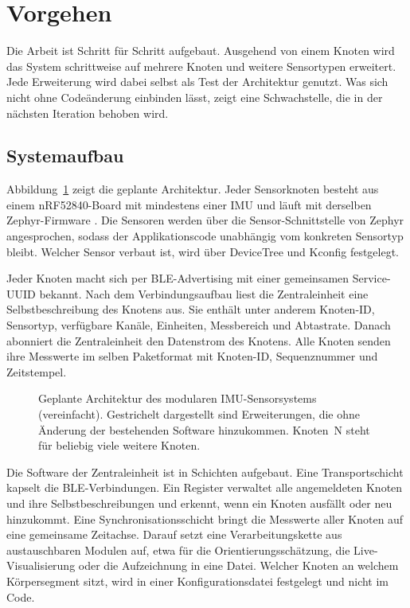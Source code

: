 \documentclass[11pt, a4paper]{article}
\begin{document}
\section{Vorgehen}\label{sec:vorgehen}

Die Arbeit ist Schritt für Schritt aufgebaut. Ausgehend von einem Knoten wird das System schrittweise auf mehrere Knoten und weitere Sensortypen erweitert. Jede Erweiterung wird dabei selbst als Test der Architektur genutzt. Was sich nicht ohne Codeänderung einbinden lässt, zeigt eine Schwachstelle, die in der nächsten Iteration behoben wird.

\subsection{Systemaufbau}

Abbildung~\ref{fig:architektur} zeigt die geplante Architektur. Jeder Sensorknoten besteht aus einem nRF52840-Board mit mindestens einer IMU und läuft mit derselben Zephyr-Firmware \cite{zephyr_docs,ncs_docs}. Die Sensoren werden über die Sensor-Schnittstelle von Zephyr angesprochen, sodass der Applikationscode unabhängig vom konkreten Sensortyp bleibt. Welcher Sensor verbaut ist, wird über DeviceTree und Kconfig festgelegt.

Jeder Knoten macht sich per BLE-Advertising mit einer gemeinsamen Service-UUID bekannt. Nach dem Verbindungsaufbau liest die Zentraleinheit eine Selbstbeschreibung des Knotens aus. Sie enthält unter anderem Knoten-ID, Sensortyp, verfügbare Kanäle, Einheiten, Messbereich und Abtastrate. Danach abonniert die Zentraleinheit den Datenstrom des Knotens. Alle Knoten senden ihre Messwerte im selben Paketformat mit Knoten-ID, Sequenznummer und Zeitstempel.

\begin{figure}[htbp]
\centering
\resizebox{\textwidth}{!}{}
\caption{Geplante Architektur des modularen IMU-Sensorsystems (vereinfacht). Gestrichelt dargestellt sind Erweiterungen, die ohne Änderung der bestehenden Software hinzukommen. Knoten~N steht für beliebig viele weitere Knoten.}
\label{fig:architektur}
\end{figure}

Die Software der Zentraleinheit ist in Schichten aufgebaut. Eine Transportschicht kapselt die BLE-Verbindungen. Ein Register verwaltet alle angemeldeten Knoten und ihre Selbstbeschreibungen und erkennt, wenn ein Knoten ausfällt oder neu hinzukommt. Eine Synchronisationsschicht bringt die Messwerte aller Knoten auf eine gemeinsame Zeitachse. Darauf setzt eine Verarbeitungskette aus austauschbaren Modulen auf, etwa für die Orientierungsschätzung, die Live-Visualisierung oder die Aufzeichnung in eine Datei. Welcher Knoten an welchem Körpersegment sitzt, wird in einer Konfigurationsdatei festgelegt und nicht im Code.
\end{document}
